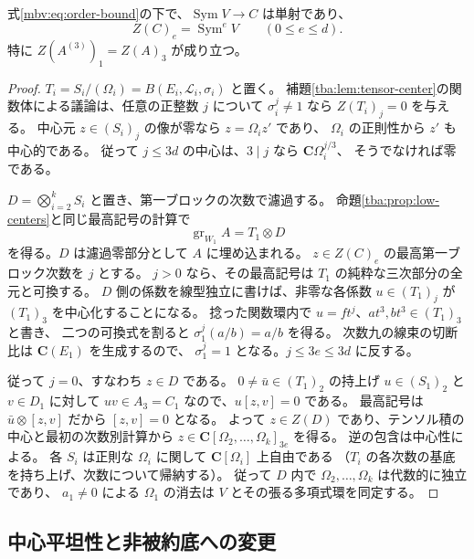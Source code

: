 \begin{proposition}
\label{mbv:prop:center}
式\eqref{mbv:eq:order-bound}の下で、$\operatorname{Sym}V\to C$ は単射であり、
\begin{equation}\label{mbv:eq:center}
 Z(C)_e=\operatorname{Sym}^eV\qquad(0\leq e\leq d).
\end{equation}
特に $Z(A^{(3)})_1=Z(A)_3$ が成り立つ。
\end{proposition}
\begin{proof}
$T_i=S_i/(\Omega_i)=B(E_i,\mathcal L_i,\sigma_i)$ と置く。
補題\ref{tba:lem:tensor-center}の関数体による議論は、任意の正整数 $j$ について
$\sigma_i^j\ne1$ なら $Z(T_i)_j=0$ を与える。
中心元 $z\in(S_i)_j$ の像が零なら $z=\Omega_i z'$ であり、
$\Omega_i$ の正則性から $z'$ も中心的である。
従って $j\leq3d$ の中心は、$3\mid j$ なら $\mathbf C\Omega_i^{j/3}$、
そうでなければ零である。

$D=\bigotimes_{i=2}^kS_i$ と置き、第一ブロックの次数で濾過する。
命題\ref{tba:prop:low-centers}と同じ最高記号の計算で
\[
 \operatorname{gr}_{W_1}A=T_1\otimes D
\]
を得る。$D$ は濾過零部分として $A$ に埋め込まれる。
$z\in Z(C)_e$ の最高第一ブロック次数を $j$ とする。
$j>0$ なら、その最高記号は $T_1$ の純粋な三次部分の全元と可換する。
$D$ 側の係数を線型独立に書けば、非零な各係数
$u\in(T_1)_j$ が $(T_1)_3$ を中心化することになる。
捻った関数環内で $u=ft^j$、$a t^3,b t^3\in(T_1)_3$ と書き、
二つの可換式を割ると
$\sigma_1^j(a/b)=a/b$ を得る。
次数九の線束の切断比は $\mathbf C(E_1)$ を生成するので、
$\sigma_1^j=1$ となる。$j\leq3e\leq3d$ に反する。

従って $j=0$、すなわち $z\in D$ である。
$0\ne\bar u\in(T_1)_2$ の持上げ $u\in(S_1)_2$ と
$v\in D_1$ に対して $uv\in A_3=C_1$ なので、$u[z,v]=0$ である。
最高記号は $\bar u\otimes[z,v]$ だから $[z,v]=0$ となる。
よって $z\in Z(D)$ であり、テンソル積の中心と最初の次数別計算から
$z\in\mathbf C[\Omega_2,\ldots,\Omega_k]_{3e}$ を得る。
逆の包含は中心性による。
各 $S_i$ は正則な $\Omega_i$ に関して
$\mathbf C[\Omega_i]$ 上自由である
（$T_i$ の各次数の基底を持ち上げ、次数について帰納する）。
従って $D$ 内で $\Omega_2,\ldots,\Omega_k$ は代数的に独立であり、
$a_1\ne0$ による $\Omega_1$ の消去は $V$ とその張る多項式環を同定する。
\end{proof}

\subsection{中心平坦性と非被約底への変更}

